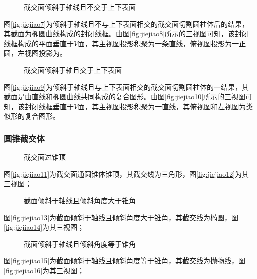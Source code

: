 \begin{figure}[htbp]
\centering
{}\hspace{60pt}
\caption{截交面倾斜于轴线且不交于上下表面}
\end{figure}
图\ref{fig:jiejiao7}为倾斜于轴线且不与上下表面相交的截交面切割圆柱体后的结果，其截面为椭圆曲线构成的封闭线框。由图\ref{fig:jiejiao8}所示的三视图可知，该封闭线框构成的平面垂直于$V$面，其主视图投影积聚为一条直线，俯视图投影为一正圆，左视图投影为。

\begin{figure}[htbp]
\hspace{60pt}
\caption{截交面倾斜于轴且交于上下表面}
\end{figure}
图\ref{fig:jiejiao9}为倾斜于轴线且与上下表面相交的截交面切割圆柱体的一结果，其截面是由直线和椭圆曲线共同构成的复合图形。由图\ref{fig:jiejiao10}所示的三视图可知，该封闭线框垂直于$V$面，其主视图投影积聚为一直线，其俯视图和左视图为类似形的复合图形。

\subsubsection{圆锥截交体}
 \begin{figure}[htbp]
 \centering
{}\hspace{60pt}
\caption{截交面过锥顶}
\end{figure}
图\ref{fig:jiejiao11}为截交面通圆锥体锥顶，其截交线为三角形，图\ref{fig:jiejiao12}为其三视图；

\begin{figure}[htbp]
\centering
{}\hspace{60pt}
\caption{截面倾斜于轴线且倾斜角度大于锥角}
\end{figure}
图\ref{fig:jiejiao13}为截面倾斜于轴线且倾斜角度大于锥角，其截交线为椭圆，图\ref{fig:jiejiao14}为其三视图；

\begin{figure}[htbp]
\centering
{}\hspace{60pt}
\caption{截面倾斜于轴线且倾斜角度等于锥角}
\end{figure}
图\ref{fig:jiejiao15}为截面倾斜于轴线且倾斜角度等于锥角，其截交线为抛物线，图\ref{fig:jiejiao16}为其三视图；

